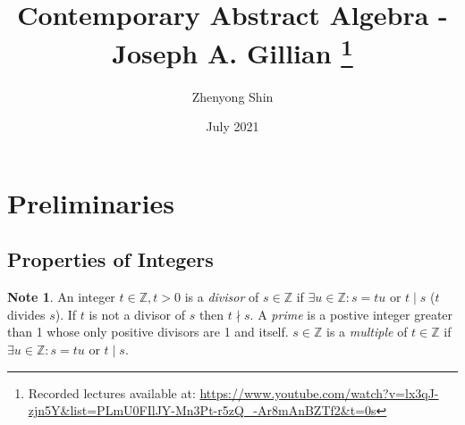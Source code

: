 \documentclass{article}
\title{Contemporary Abstract Algebra - Joseph A. Gillian \footnote{Recorded lectures available at: \url{https://www.youtube.com/watch?v=lx3qJ-zjn5Y&list=PLmU0FIlJY-Mn3Pt-r5zQ_-Ar8mAnBZTf2&t=0s}}}
\author{Zhenyong Shin}
\date{July 2021}
\newtheorem{axiom}{Axiom}[section]
\theoremstyle{definition}
\newtheorem{note}{Note}[section]
\begin{document}
\maketitle

\setcounter{section}{-1}
\section{Preliminaries}
\subsection{Properties of Integers}

\begin{note} 
An integer $t \in \mathbb{Z}, t>0$ is a \textit{divisor} of $s \in \mathbb{Z}$ if $\exists u \in \mathbb{Z}: s = tu$ or $t \mid s$ ($t$ divides $s$). If $t$ is not a divisor of $s$ then $t \nmid s$. A \textit{prime} is a postive integer greater than 1 whose only positive divisors are 1 and itself. $s \in \mathbb{Z}$ is a \textit{multiple} of $t \in \mathbb{Z}$ if $\exists u \in \mathbb{Z}: s = tu$ or $t \mid s$.
\end{note}
\end{document}
